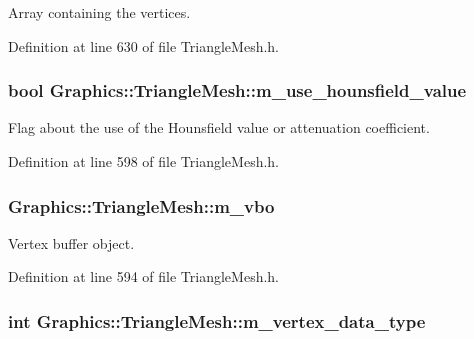 Array containing the vertices. 



Definition at line 630 of file TriangleMesh.h.

\hypertarget{class_graphics_1_1_triangle_mesh_afd8f8397af871a5c9ed07545cc12ae49}{
\subsubsection[{m\_\-use\_\-hounsfield\_\-value}]{\setlength{\rightskip}{0pt plus 5cm}bool {\bf Graphics::TriangleMesh::m\_\-use\_\-hounsfield\_\-value}}}
\label{class_graphics_1_1_triangle_mesh_afd8f8397af871a5c9ed07545cc12ae49}


Flag about the use of the Hounsfield value or attenuation coefficient. 



Definition at line 598 of file TriangleMesh.h.

\hypertarget{class_graphics_1_1_triangle_mesh_aa2ff3ba03b750b6b0900a02614db0277}{
\subsubsection[{m\_\-vbo}]{ {\bf Graphics::TriangleMesh::m\_\-vbo}}}
\label{class_graphics_1_1_triangle_mesh_aa2ff3ba03b750b6b0900a02614db0277}


Vertex buffer object. 



Definition at line 594 of file TriangleMesh.h.

\hypertarget{class_graphics_1_1_triangle_mesh_ae76c0a34fff7953312143e274acf1eff}{
\subsubsection[{m\_\-vertex\_\-data\_\-type}]{\setlength{\rightskip}{0pt plus 5cm}int {\bf Graphics::TriangleMesh::m\_\-vertex\_\-data\_\-type}}}
\label{class_graphics_1_1_triangle_mesh_ae76c0a34fff7953312143e274acf1eff}


